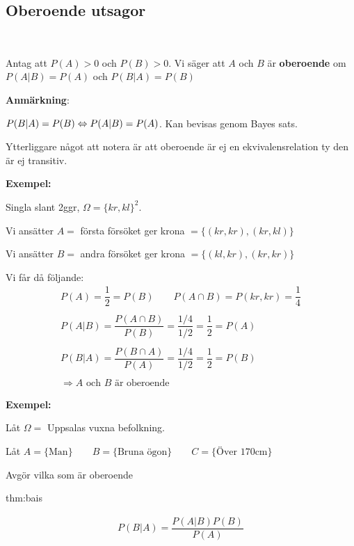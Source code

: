 \subsection{Oberoende utsagor}\hfill\\
\par
\noindent Antag att $P(A) >0$ och $P(B)>0$. Vi säger att $A$ och $B$ är \textbf{oberoende} om $P(A|B) = P(A)$ och $P(B|A) = P(B)$
\par\bigskip
\noindent\textbf{Anmärkning}:\par
\noindent $P(B|A) = P(B)\Leftrightarrow P(A|B) = P(A)$. Kan bevisas genom Bayes sats.\par
\noindent Ytterliggare något att notera är att oberoende är ej en ekvivalensrelation ty den är ej transitiv.
\par\bigskip
\noindent\textbf{Exempel:}\par
\noindent Singla slant 2ggr, $\Omega = \{kr,kl\}^2$.\par
\noindent Vi ansätter $A= $ första försöket ger krona $= \{(kr,kr),(kr,kl)\}$\par
\noindent Vi ansätter $B = $ andra försöket ger krona $ = \{(kl,kr),(kr,kr)\}$
\par\bigskip
\noindent Vi får då följande:
\begin{equation*}
  \begin{gathered}
    P(A) = \dfrac{1}{2} = P(B)\qquad P(A\cap B) = P(kr,kr) = \dfrac{1}{4}\\\\
    P(A|B) = \dfrac{P(A\cap B)}{P(B)} = \dfrac{1/4}{1/2} = \dfrac{1}{2} = P(A)\\\\
    P(B|A) = \dfrac{P(B\cap A)}{P(A)} = \dfrac{1/4}{1/2} = \dfrac{1}{2}=P(B)\\\\
    \Rightarrow\text{$A$ och $B$ är oberoende}
  \end{gathered}
\end{equation*}
\par\bigskip
\noindent\textbf{Exempel:}\par
\noindent Låt $\Omega = $ Uppsalas vuxna befolkning.\par
\noindent Låt $A = \{\text{Man}\}\qquad B = \{\text{Bruna ögon}\}\qquad C = \{\text{Över 170cm}\}$
\par\bigskip
\noindent Avgör vilka som är oberoende
\newpage
\begin{theo}{thm:bais}

  \begin{equation*}
    \begin{gathered}
      P(B|A) = \dfrac{P(A|B)P(B)}{P(A)}
    \end{gathered}
  \end{equation*}
\end{theo}
